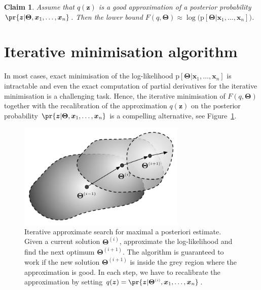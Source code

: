 \documentclass{article}
\newtheorem{claim}{Claim}
\renewcommand{\vec}[1]{\boldsymbol{#1}}
\newcommand{\pd}[1]{\mathrm{p}[#1]}
\newcommand{\supi}[1]{^{\scriptscriptstyle(#1)}}
\begin{document}
\begin{claim}
Assume that $q(\vec{z})$ is a good approximation of a posterior probability $\pr{\vec{z}|\vec{\Theta},\vec{x}_1,\ldots,\vec{x}_n}$. Then the lower bound $F(q,\vec{\Theta})\approx\log\bigl(\pd{\vec{\Theta}|\vec{x}_1,\ldots,\vec{x}_n}\bigr)$. 
\end{claim} 

\section{Iterative minimisation algorithm}

In most cases, exact minimisation of the log-likelihood $\pd{\vec{\Theta}|\vec{x}_1,\ldots,\vec{x}_n}$ is intractable and even the exact computation of partial derivatives for the iterative minimisation is a challenging task. Hence, the iterative minimisation of $F(q,\vec{\Theta})$ together with the recalibration of the approximation $q(\vec{z})$ on the posterior probability $\pr{\vec{z}|\vec{\Theta},\vec{x}_1,\ldots,\vec{x}_n}$ is a compelling alternative, see Figure~\ref{fig:iterative-approximation}.

\begin{figure}[!t]
\begin{center}
\includegraphics[width=8cm]{illustrations/em-approximation}
\end{center}
\caption{Iterative approximate search for maximal a posteriori estimate. Given a current solution $\vec{\Theta}\supi{i}$, approximate the log-likelihood and find the next optimum $\vec{\Theta}^{(i+1)}$. The algorithm is guaranteed to work if the new solution $\vec{\Theta}\supi{i+1}$ is inside the grey region where the approximation is good. In each step, we have to recalibrate the approximation by setting $q(\vec{z})=\pr{\smash{\vec{z}|\vec{\Theta}\supi{i},\vec{x}_1,\ldots,\vec{x}_n}}$.   }
\label{fig:iterative-approximation}
\end{figure}      
\end{document}
